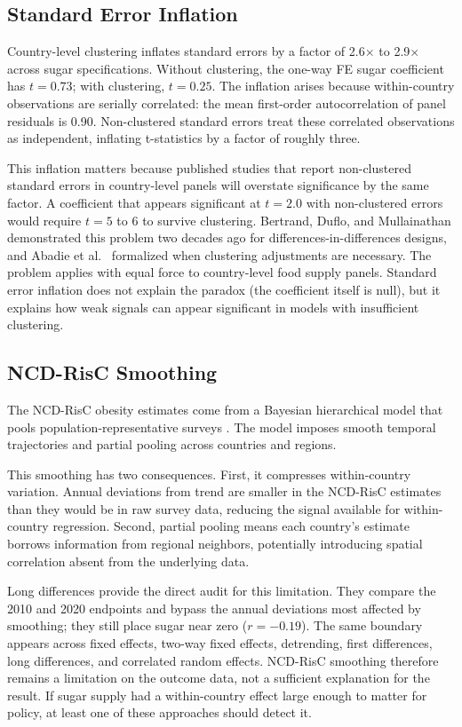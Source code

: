 \subsection{Standard Error Inflation}

Country-level clustering inflates standard errors by a factor of 2.6$\times$ to 2.9$\times$ across sugar specifications. Without clustering, the one-way FE sugar coefficient has $t = 0.73$; with clustering, $t = 0.25$. The inflation arises because within-country observations are serially correlated: the mean first-order autocorrelation of panel residuals is 0.90. Non-clustered standard errors treat these correlated observations as independent, inflating t-statistics by a factor of roughly three.

This inflation matters because published studies that report non-clustered standard errors in country-level panels will overstate significance by the same factor. A coefficient that appears significant at $t = 2.0$ with non-clustered errors would require $t = 5$ to $6$ to survive clustering. Bertrand, Duflo, and Mullainathan \cite{bertrand2004} demonstrated this problem two decades ago for differences-in-differences designs, and Abadie et al.\ \cite{abadie2023} formalized when clustering adjustments are necessary. The problem applies with equal force to country-level food supply panels. Standard error inflation does not explain the paradox (the coefficient itself is null), but it explains how weak signals can appear significant in models with insufficient clustering.

\subsection{NCD-RisC Smoothing}

The NCD-RisC obesity estimates come from a Bayesian hierarchical model that pools population-representative surveys \cite{ncdrisc2024bmi}. The model imposes smooth temporal trajectories and partial pooling across countries and regions.

This smoothing has two consequences. First, it compresses within-country variation. Annual deviations from trend are smaller in the NCD-RisC estimates than they would be in raw survey data, reducing the signal available for within-country regression. Second, partial pooling means each country's estimate borrows information from regional neighbors, potentially introducing spatial correlation absent from the underlying data.

Long differences provide the direct audit for this limitation. They compare the 2010 and 2020 endpoints and bypass the annual deviations most affected by smoothing; they still place sugar near zero ($r = -0.19$). The same boundary appears across fixed effects, two-way fixed effects, detrending, first differences, long differences, and correlated random effects. NCD-RisC smoothing therefore remains a limitation on the outcome data, not a sufficient explanation for the result. If sugar supply had a within-country effect large enough to matter for policy, at least one of these approaches should detect it.

